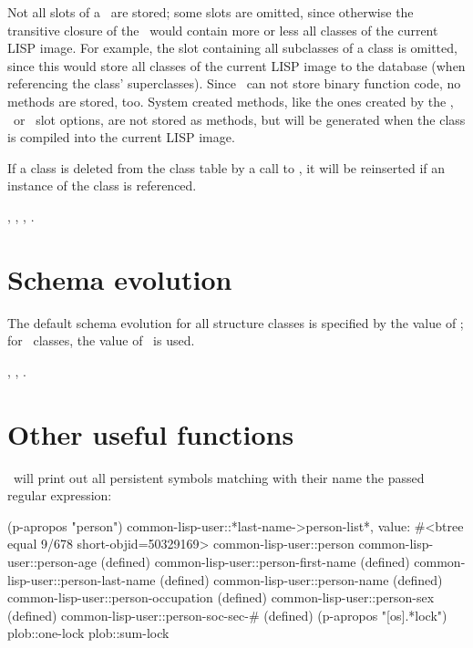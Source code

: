 Not all slots of a \clsmo\ are stored; some slots are omitted, since
otherwise the transitive closure of the \clsmo\ would contain more or
less all classes of the current LISP image. For example, the slot
containing all subclasses of a class is omitted, since this would
store all classes of the current LISP image to the database (when
referencing the class' superclasses).  Since \plob\ can not store
binary function code, no methods are stored, too.  System created
methods, like the ones created by the ,
\ or \ slot options, are not stored as
methods, but will be generated when the class is compiled into the
current LISP image.

If a class is deleted from the class table by a call to
, it will be reinserted if an instance of the
class is referenced.

 {}, ,
, .

\section{Schema evolution}%
\label{sec:SchemaEvolution}

The default schema evolution for all structure classes is specified by
the value of ; for \clos\ 
classes, the value of \ is
used.

 {},
,
.

\section{Other useful functions}

\ will print out all persistent symbols matching with
their name the passed regular expression:
\begin{IndentedCompactCode}
\listener{}(p-apropos "person")
common-lisp-user::*last-name->person-list*,
                  value: #<btree equal 9/678 short-objid=50329169>
common-lisp-user::person
common-lisp-user::person-age (defined)
common-lisp-user::person-first-name (defined)
common-lisp-user::person-last-name (defined)
common-lisp-user::person-name (defined)
common-lisp-user::person-occupation (defined)
common-lisp-user::person-sex (defined)
common-lisp-user::person-soc-sec-# (defined)
\listener{}(p-apropos "[os].*lock")
plob::one-lock
plob::sum-lock
\end{IndentedCompactCode}

